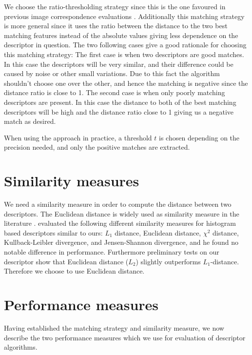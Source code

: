 \documentclass[thesis.tex]{subfiles}
\begin{document}
We choose the ratio-thresholding strategy since this is the one favoured in previous image correspondence evaluations \cite{mikolajczyk2005performance,dahl2011finding,larsen2012jet,lowe2004distinctive}. Additionally this matching strategy is more general since it uses the ratio between the distance to the two best matching features instead of the absolute values giving less dependence on the descriptor in question. The two following cases give a good rationale for choosing this matching strategy: The first case is when two descriptors are good matches. In this case the descriptors will be very similar, and their difference could be caused by noise or other small variations. Due to this fact the algorithm shouldn't choose one over the other, and hence the matching is negative since the distance ratio is close to 1. The second case is when only poorly matching descriptors are present. In this case the distance to both of the best matching descriptors will be high and the distance ratio close to 1 giving us a negative match as desired.

When using the approach in practice, a threshold $t$ is chosen depending on the precision needed, and only the positive matches are extracted.


\section{Similarity measures}
\label{sec:similarity_measure}
We need a similarity measure in order to compute the distance between two descriptors.  The Euclidean distance is widely used as similarity measure in the literature \cite{lowe2004distinctive,ke2004pca,mikolajczyk2005performance}. \citet{larsen2012in} evaluated the following different similarity measures for histogram based descriptors similar to ours: $L_1$ distance, Euclidean distance, $\chi^2$ distance, Kullback-Leibler divergence, and Jensen-Shannon divergence, and he found no notable difference in performance. Furthermore preliminary tests on our descriptor show that Euclidean distance ($L_2$) slightly outperforms $L_1$-distance. Therefore we choose to use Euclidean distance.

\section{Performance measures}
\label{sec:performance_measures}

Having established the matching strategy and similarity measure, we now describe the two performance measures which we use for evaluation of descriptor algorithms.
\end{document}
